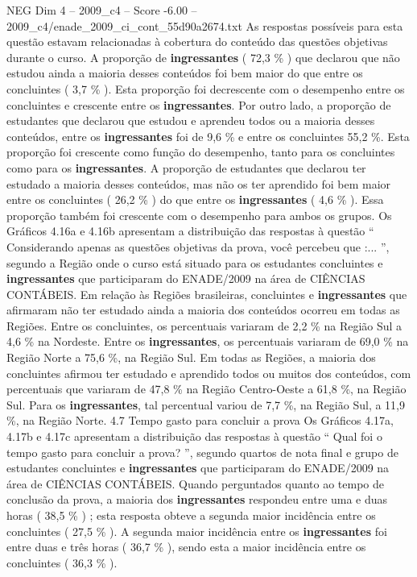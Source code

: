 \begin{textsample}{NEG Dim 4 – 2009\_c4 – Score -6.00 – 2009\_c4/enade\_2009\_ci\_cont\_55d90a2674.txt}
As respostas possíveis para esta questão estavam relacionadas à cobertura do conteúdo das questões objetivas durante o curso.
A proporção de \textbf{ingressantes} ( 72,3 \% ) que declarou que não estudou ainda a maioria desses conteúdos foi bem maior do que entre os concluintes ( 3,7 \% ).
Esta proporção foi decrescente com o desempenho entre os concluintes e crescente entre os \textbf{ingressantes}.
Por outro lado, a proporção de estudantes que declarou que estudou e aprendeu todos ou a maioria desses conteúdos, entre os \textbf{ingressantes} foi de 9,6 \% e entre os concluintes 55,2 \%.
Esta proporção foi crescente como função do desempenho, tanto para os concluintes como para os \textbf{ingressantes}.
A proporção de estudantes que declarou ter estudado a maioria desses conteúdos, mas não os ter aprendido foi bem maior entre os concluintes ( 26,2 \% ) do que entre os \textbf{ingressantes} ( 4,6 \% ).
Essa proporção também foi crescente com o desempenho para ambos os grupos.
Os Gráficos 4.16a e 4.16b apresentam a distribuição das respostas à questão “ Considerando apenas as questões objetivas da prova, você percebeu que :... ”, segundo a Região onde o curso está situado para os estudantes concluintes e \textbf{ingressantes} que participaram do ENADE/2009 na área de CIÊNCIAS CONTÁBEIS.
Em relação às Regiões brasileiras, concluintes e \textbf{ingressantes} que afirmaram não ter estudado ainda a maioria dos conteúdos ocorreu em todas as Regiões.
Entre os concluintes, os percentuais variaram de 2,2 \% na Região Sul a 4,6 \% na Nordeste.
Entre os \textbf{ingressantes}, os percentuais variaram de 69,0 \% na Região Norte a 75,6 \%, na Região Sul.
Em todas as Regiões, a maioria dos concluintes afirmou ter estudado e aprendido todos ou muitos dos conteúdos, com percentuais que variaram de 47,8 \% na Região Centro-Oeste a 61,8 \%, na Região Sul.
Para os \textbf{ingressantes}, tal percentual variou de 7,7 \%, na Região Sul, a 11,9 \%, na Região Norte. 4.7 Tempo gasto para concluir a prova Os Gráficos 4.17a, 4.17b e 4.17c apresentam a distribuição das respostas à questão “ Qual foi o tempo gasto para concluir a prova? ”, segundo quartos de nota final e grupo de estudantes concluintes e \textbf{ingressantes} que participaram do ENADE/2009 na área de CIÊNCIAS CONTÁBEIS.
Quando perguntados quanto ao tempo de conclusão da prova, a maioria dos \textbf{ingressantes} respondeu entre uma e duas horas ( 38,5 \% ) ; esta resposta obteve a segunda maior incidência entre os concluintes ( 27,5 \% ).
A segunda maior incidência entre os \textbf{ingressantes} foi entre duas e três horas ( 36,7 \% ), sendo esta a maior incidência entre os concluintes ( 36,3 \% ).

\end{textsample}
